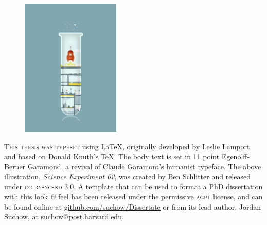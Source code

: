 \newpage
\chead{ }

\begin{figure}
  \vspace{20pt}
  \centering
  \hspace*{-32pt}
  \includegraphics[width=0.42\textwidth]{endmatter/colophon.png}
\end{figure}


\begin{center}
\parbox{200pt}{\lettrine[lines=3,slope=-2pt,nindent=-4pt]{\textcolor{SchoolColor}{T}}{his thesis was typeset} using \LaTeX, originally developed by Leslie Lamport and based on Donald Knuth's \TeX. The body text is set in 11 point Egenolff-Berner Garamond, a revival of Claude Garamont's humanist typeface. The above illustration, \textit{Science Experiment 02}, was created by Ben Schlitter and released under \href{http://creativecommons.org/licenses/by-nc-nd/3.0/}{\textsc{cc by-nc-nd 3.0}}. A template that can be used to format a PhD dissertation with this look \textit{\&} feel has been released under the permissive \textsc{agpl} license, and can be found online at \href{https://github.com/suchow/Dissertate}{github.com/suchow/Dissertate} or from its lead author, Jordan Suchow, at \href{mailto:suchow@post.harvard.edu}{suchow@post.harvard.edu}.}
\end{center}
